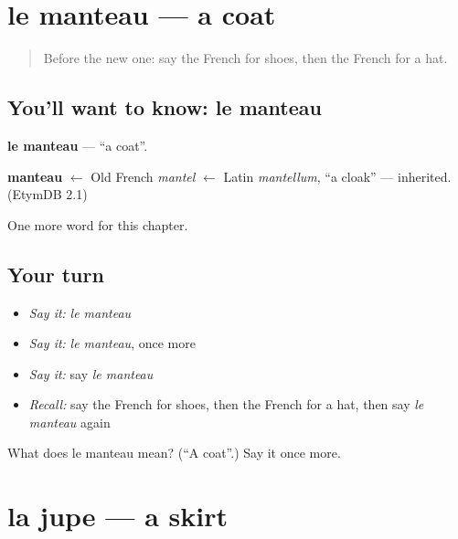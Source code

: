 \section[le manteau]{le manteau — a coat}

\label{lesson:FR-C104-manteau}



\begin{quote}
Before the new one: say the French for shoes, then the French for a hat.
\end{quote}

\subsection*{You'll want to know: le manteau}
\textbf{le manteau} — \textquotedblleft{}a coat\textquotedblright{}.

\begin{cousinweb}
\textbf{manteau} $\leftarrow$ Old French \emph{mantel} $\leftarrow$ Latin \emph{mantellum}, \textquotedblleft{}a cloak\textquotedblright{} — inherited. (EtymDB 2.1)
\end{cousinweb}

\begin{grammarlens}[title={What you've built}]
One more word for this chapter.
\end{grammarlens}

\subsection*{Your turn}
\begin{itemize}
\raggedright
  \item \emph{Say it:} \emph{le manteau}
  \item \emph{Say it:} \emph{le manteau}, once more
  \item \emph{Say it:} say \emph{le manteau}
  \item \emph{Recall:} say the French for shoes, then the French for a hat, then say \emph{le manteau} again
\end{itemize}

\begin{tcolorbox}[breakable,colback=teal!4,colframe=teal!35!black,title={Before you move on}]
What does le manteau mean? (\textquotedblleft{}A coat\textquotedblright{}.) Say it once more.
\end{tcolorbox}
\section[la jupe]{la jupe — a skirt}

